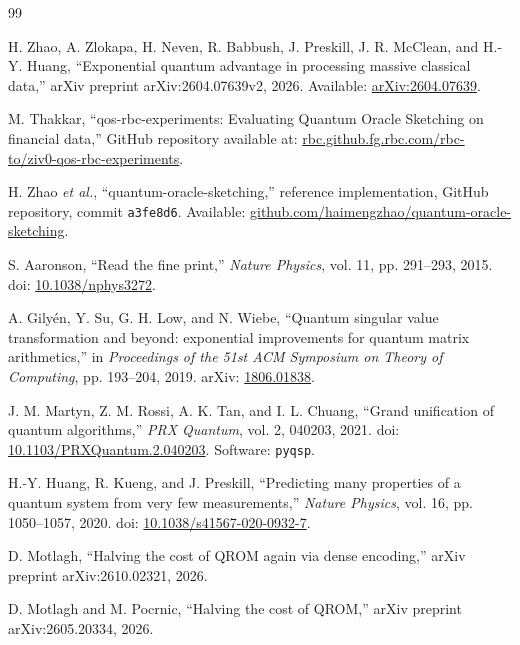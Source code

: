 \documentclass[10pt]{article}
\begin{document}
\clearpage

\begin{thebibliography}{99}

H. Zhao, A. Zlokapa, H. Neven, R. Babbush, J. Preskill,
J. R. McClean, and H.-Y. Huang,
``Exponential quantum advantage in processing massive classical data,''
arXiv preprint arXiv:2604.07639v2, 2026.
Available: \href{https://arxiv.org/abs/2604.07639}{arXiv:2604.07639}.

M. Thakkar,
``qos-rbc-experiments: Evaluating Quantum Oracle Sketching on financial data,''
GitHub repository available at: \href{https://rbc.github.fg.rbc.com/rbc-to/ziv0-qos-rbc-experiments}{rbc.github.fg.rbc.com/rbc-to/ziv0-qos-rbc-experiments}.

H. Zhao \textit{et al.},
``quantum-oracle-sketching,'' reference implementation, GitHub repository, commit \texttt{a3fe8d6}.
Available: \href{https://github.com/haimengzhao/quantum-oracle-sketching}{github.com/haimengzhao/quantum-oracle-sketching}.

S. Aaronson,
``Read the fine print,''
\textit{Nature Physics}, vol. 11, pp. 291--293, 2015.
doi: \href{https://doi.org/10.1038/nphys3272}{10.1038/nphys3272}.

A. Gily\'en, Y. Su, G. H. Low, and N. Wiebe,
``Quantum singular value transformation and beyond: exponential improvements for quantum matrix arithmetics,''
in \textit{Proceedings of the 51st ACM Symposium on Theory of Computing}, pp. 193--204, 2019.
arXiv: \href{https://arxiv.org/abs/1806.01838}{1806.01838}.

J. M. Martyn, Z. M. Rossi, A. K. Tan, and I. L. Chuang,
``Grand unification of quantum algorithms,''
\textit{PRX Quantum}, vol. 2, 040203, 2021.
doi: \href{https://doi.org/10.1103/PRXQuantum.2.040203}{10.1103/PRXQuantum.2.040203}.
Software: \texttt{pyqsp}.

H.-Y. Huang, R. Kueng, and J. Preskill,
``Predicting many properties of a quantum system from very few measurements,''
\textit{Nature Physics}, vol. 16, pp. 1050--1057, 2020.
doi: \href{https://doi.org/10.1038/s41567-020-0932-7}{10.1038/s41567-020-0932-7}.

D. Motlagh,
``Halving the cost of QROM again via dense encoding,''
arXiv preprint arXiv:2610.02321, 2026.

D. Motlagh and M. Pocrnic,
``Halving the cost of QROM,''
arXiv preprint arXiv:2605.20334, 2026.


\end{thebibliography}
\end{document}

